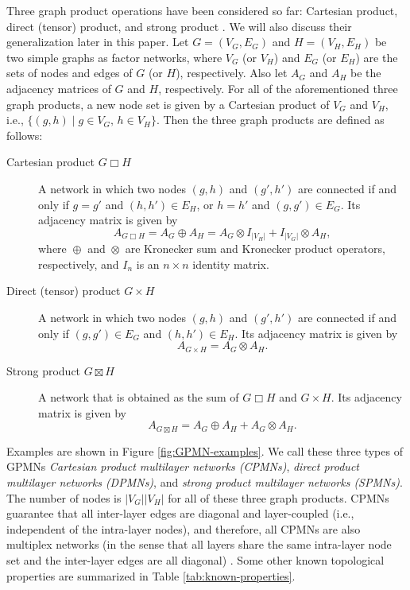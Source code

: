 \documentclass{article}
\DeclareMathOperator*{\CP}{\Box}
\DeclareMathOperator*{\DP}{\times}
\DeclareMathOperator*{\SP}{\boxtimes}
\DeclareMathOperator*{\KS}{\oplus}
\DeclareMathOperator*{\KP}{\otimes}
\begin{document}
Three graph product operations have been considered so far: Cartesian
product, direct (tensor) product, and strong product
\cite{sayama2016estimation}. We will also discuss their generalization
later in this paper. Let $G=(V_G, E_G)$ and $H=(V_H, E_H)$ be two
simple graphs as factor networks, where $V_G$ (or $V_H$) and $E_G$ (or
$E_H$) are the sets of nodes and edges of $G$ (or $H$), respectively.
Also let $A_G$ and $A_H$ be the adjacency matrices of $G$ and $H$,
respectively. For all of the aforementioned three graph products, a
new node set is given by a Cartesian product of $V_G$ and $V_H$, i.e.,
$\{(g,h) \; | \; g\in V_G , \, h\in V_H\}$. Then the three graph
products are defined as follows:
\begin{description}
\item[Cartesian product $G \CP H$] A network in which two nodes $(g,
  h)$ and $(g', h')$ are connected if and only if $g = g'$ and $(h,
  h') \in E_H$, or $h = h'$ and $(g, g') \in E_G$. Its adjacency
  matrix is given by
\begin{equation}
A_{G \CP H} = A_G \KS A_H = A_G \KP I_{|V_H|} + I_{|V_G|} \KP A_H, \label{eq:cp}
\end{equation}
where $\KS$ and $\KP$ are Kronecker sum and Kronecker product
operators, respectively, and $I_n$ is an $n \times n$ identity matrix.
\item[Direct (tensor) product $G \DP H$] A network in which two nodes
  $(g, h)$ and $(g', h')$ are connected if and only if $(g, g') \in
  E_G$ and $(h, h') \in E_H$. Its adjacency matrix is given by
\begin{equation}
A_{G \DP H} = A_G \KP A_H. \label{eq:dp}
\end{equation}
\item[Strong product $G \SP H$] A network that is obtained as the sum
  of $G \CP H$ and $G \DP H$. Its adjacency matrix is given by
\begin{equation}
A_{G \SP H} = A_G \KS A_H + A_G \KP A_H. \label{eq:sp}
\end{equation}
\end{description}
Examples are shown in Figure \ref{fig:GPMN-examples}. We call these
three types of GPMNs {\em Cartesian product multilayer networks
  (CPMNs)}, {\em direct product multilayer networks (DPMNs)}, and {\em
  strong product multilayer networks (SPMNs)}. The number of nodes is
$|V_G| |V_H|$ for all of these three graph products. CPMNs guarantee
that all inter-layer edges are diagonal and layer-coupled (i.e.,
independent of the intra-layer nodes), and therefore, all CPMNs are
also multiplex networks (in the sense that all layers share the same
intra-layer node set and the inter-layer edges are all diagonal)
\cite{kivela2014multilayer}. Some other known topological properties
are summarized in Table \ref{tab:known-properties}.
\end{document}

